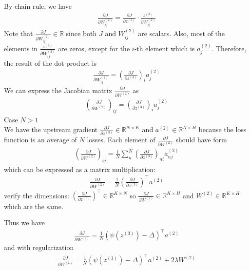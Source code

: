 \documentclass{article}
\newcommand{\ab}{a^{(2)}}
\newcommand{\zc}{z^{(3)}}
\newcommand{\Wb}{W^{(2)}}
\begin{document}
By chain rule, we have
\begin{align*}
    \frac{\partial J}{\partial \Wb_{ij}} = \frac{\partial J}{\partial \zc} \cdot \frac{\zc}{\partial \Wb_{ij}}
\end{align*}
Note that $\frac{\partial J}{\partial \Wb_{ij}} \in \mathbb{R}$ since both $J$ and $\Wb_{ij}$ are scalars.
Also, most of the elements in $\frac{\zc}{\partial \Wb_{ij}}$ are zeros, except for the $i$-th element which is $\ab_j$.
Therefore, the result of the dot product is
\begin{align*}
    \frac{\partial J}{\partial \Wb_{ij}} = (\frac{\partial J}{\partial \zc})_i \ab_j
\end{align*}
We can express the Jacobian matrix $\frac{\partial J}{\partial \Wb}$ as
\begin{align*}
    \left(\frac{\partial J}{\partial \Wb}\right)_{ij} = \left(\frac{\partial J}{\partial \zc}\right)_i \ab_j
\end{align*}
Case $N > 1$\\
We have the upstream gradient $\frac{\partial J}{\partial \zc} \in \mathbb{R}^{N\times K}$ 
and $\ab \in \mathbb{R}^{N\times H}$ because the loss function is an average of $N$ losses.
Each element of $\frac{\partial J}{\partial \Wb}$ should have form 
\begin{align*}
    \left(\frac{\partial J}{\partial \Wb}\right)_{ij} = \frac{1}{N}\sum_{n}^{N}\left(\frac{\partial J}{\partial \zc}\right)_{ni} \ab_{nj}
\end{align*}
which can be expressed as a matrix multiplication:
\begin{align*}
    \frac{\partial J}{\partial \Wb} = \frac{1}{N}{\left(\frac{\partial J}{\partial \zc}\right)}^\top\ab
\end{align*}
verify the dimensions: ${\left(\frac{\partial J}{\partial \zc}\right)}^\top\in\mathbb{R}^{K\times N}$
so $\frac{\partial J}{\partial \Wb} \in \mathbb{R}^{K\times H}$ and $\Wb\in \mathbb{R}^{K\times H}$ 
which are the same.

Thus we have 
\begin{align*}
    \frac{\partial J}{\partial \Wb} = \frac{1}{N}{\left(\psi(z^{(3)}) - \Delta\right)}^\top\ab
\end{align*}
and with regularization
\begin{align*}
    \frac{\partial \tilde{J}}{\partial \Wb} = \frac{1}{N}{\left(\psi(z^{(3)}) - \Delta\right)}^\top\ab + 2\lambda \Wb
\end{align*}
\end{document}
